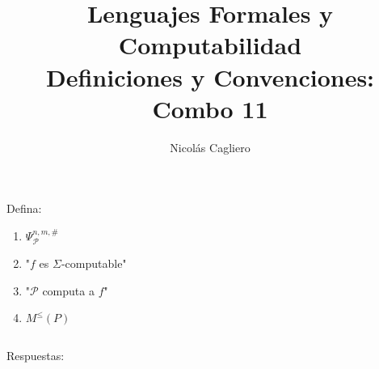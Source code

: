 \documentclass{article}
\title{Lenguajes Formales y Computabilidad \\
        \large Definiciones y Convenciones: Combo 11 }
\author{Nicolás Cagliero}
\begin{document}
\maketitle

Defina:

\begin{enumerate}
    \item $\Psi_{\mathcal{P}}^{n, m, \#}$

    \item "$f$ es $\Sigma$-computable"
    
    \item "$\mathcal{P}$ computa a $f$"
    
    \item $M^{\leq}(P)$
\end{enumerate}

\(\)
\begin{center}
    Respuestas: 
    \(\)
\end{center}
\end{document}
